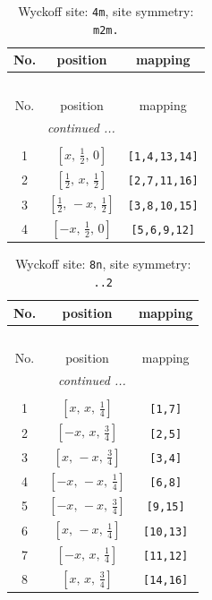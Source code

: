\documentclass[fleqn,8pt]{jsarticle}
\begin{document}
\renewcommand{\arraystretch}{1.2}
\begin{longtable}{ccc}
\caption{Wyckoff site: {\tt 4m}, site symmetry: {\tt m2m.}}
 \\
 \hline \hline
No. & position & mapping \\ \hline \endfirsthead

\multicolumn{2}{l}{\tablename\ \thetable{}} \\
 \hline \hline
No. & position & mapping \\ \hline \endhead

 \hline \hline
\multicolumn{2}{r}{\footnotesize\it continued ...} \\ \endfoot

 \hline \hline
\multicolumn{2}{r}{} \\ \endlastfoot

1 & $\left[ x,\, \frac{1}{2},\, 0 \right]$ & {\tt [1,4,13,14]} \\ \hline
2 & $\left[ \frac{1}{2},\, x,\, \frac{1}{2} \right]$ & {\tt [2,7,11,16]} \\ \hline
3 & $\left[ \frac{1}{2},\, - x,\, \frac{1}{2} \right]$ & {\tt [3,8,10,15]} \\ \hline
4 & $\left[ - x,\, \frac{1}{2},\, 0 \right]$ & {\tt [5,6,9,12]} \\
\end{longtable}
\renewcommand{\arraystretch}{1.2}
\begin{longtable}{ccc}
\caption{Wyckoff site: {\tt 8n}, site symmetry: {\tt ..2}}
 \\
 \hline \hline
No. & position & mapping \\ \hline \endfirsthead

\multicolumn{2}{l}{\tablename\ \thetable{}} \\
 \hline \hline
No. & position & mapping \\ \hline \endhead

 \hline \hline
\multicolumn{2}{r}{\footnotesize\it continued ...} \\ \endfoot

 \hline \hline
\multicolumn{2}{r}{} \\ \endlastfoot

1 & $\left[ x,\, x,\, \frac{1}{4} \right]$ & {\tt [1,7]} \\ \hline
2 & $\left[ - x,\, x,\, \frac{3}{4} \right]$ & {\tt [2,5]} \\ \hline
3 & $\left[ x,\, - x,\, \frac{3}{4} \right]$ & {\tt [3,4]} \\ \hline
4 & $\left[ - x,\, - x,\, \frac{1}{4} \right]$ & {\tt [6,8]} \\ \hline
5 & $\left[ - x,\, - x,\, \frac{3}{4} \right]$ & {\tt [9,15]} \\ \hline
6 & $\left[ x,\, - x,\, \frac{1}{4} \right]$ & {\tt [10,13]} \\ \hline
7 & $\left[ - x,\, x,\, \frac{1}{4} \right]$ & {\tt [11,12]} \\ \hline
8 & $\left[ x,\, x,\, \frac{3}{4} \right]$ & {\tt [14,16]} \\
\end{longtable}
\end{document}
